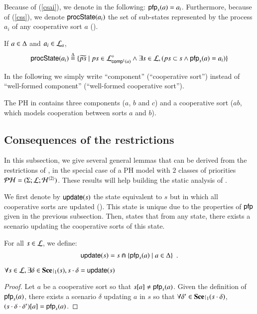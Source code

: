 Because of (\ref{csai}), we denote in the following: $\pfp_s(a) = a_i$.
Furthermore, because of (\ref{css}), we denote $\csState(a_i)$ the set of sub-states represented by the process $a_i$ of any cooperative sort $a$ ().
\begin{definition}[$\csState : \PHproc \rightarrow \powerset(\PHproc)$]
\label{def:csState}
  If $a \in \cs$ and $a_i \in \PHl_a$, 
  $$\csState(a_i) \DEF \{ \toset{ps} \mid ps\in\PHsubl[\PHl]_{\compin(a)} \wedge
  							\exists s\in\PHl, (ps\subset s\wedge \pfp_s(a)=a_i)
							\}$$
\end{definition}

In the following we simply write “component” (\resp “cooperative sort”) instead of “well-formed component” (\resp “well-formed cooperative sort”).

\begin{example}
  The PH in  contains three components ($a$, $b$ and $c$) and a cooperative sort ($ab$, which models cooperation between sorts $a$ and $b$).
\end{example}


\subsection{Consequences of the restrictions}

In this subsection, we give several general lemmas that can be derived from the restrictions of ,
in the special case of a PH model with $2$ classes of priorities $\PH = (\PHs; \PHl; \PHa^{\langle 2 \rangle})$.
These results will help building the static analysis of .

We first denote by $\update(s)$ the state equivalent to $s$ but in which all cooperative sorts are updated ().
This state is unique due to the properties of $\pfp$ given in the previous subsection.
Then,  states that from any state, there exists a scenario updating the cooperative sorts of this state.
%
\begin{definition}[$\update : \PHl \rightarrow \PHl$]
\label{def:update}
  For all $s \in \PHl$, we define:
  \begin{align*}
    \update(s) = s \Cap \{ \pfp_{s}(a) \mid a \in \cs \} \enspace.
  \end{align*}
\end{definition}
%
\begin{lemma}
\label{lem:update}
  $\forall s \in \PHl, \exists \delta \in \restriction{\Sce}{1}(s), s \PHplay \delta = \update(s)$
\end{lemma}
%
\begin{proof}
  Let $a$ be a cooperative sort so that $\PHget{s}{a} \neq \pfp_s(a)$.
  Given the definition of $\pfp_s(a)$, there exists a scenario $\delta$ updating $a$ in $s$ so that
  $\forall \delta' \in \restriction{\Sce}{1}(s \PHplay \delta)$, $\PHget{(s \PHplay \delta \PHplay \delta')}{a} = \pfp_s(a)$.
\end{proof}

